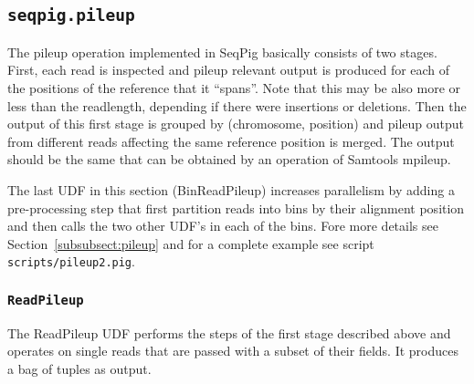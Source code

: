 \subsection{\texttt{seqpig.pileup}}

The pileup operation implemented in SeqPig basically consists of two
stages.  First, each read is inspected and pileup relevant output is
produced for each of the positions of the reference that it
``spans''. Note that this may be also more or less than the
readlength, depending if there were insertions or deletions. Then the
output of this first stage is grouped by (chromosome, position) and
pileup output from different reads affecting the same reference
position is merged. The output should be the same that can be obtained
by an operation of Samtools mpileup.

The last UDF in this section (BinReadPileup) increases parallelism by
adding a pre-processing step that first partition reads into bins by
their alignment position and then calls the two other UDF's in each of
the bins. Fore more details see Section~\ref{subsubsect:pileup}
and for a complete example see script \texttt{scripts/pileup2.pig}.

\subsubsection{\texttt{ReadPileup}}

The ReadPileup UDF performs the steps of the first stage described
above and operates on single reads that are passed with a subset of
their fields. It produces a bag of tuples as output.

